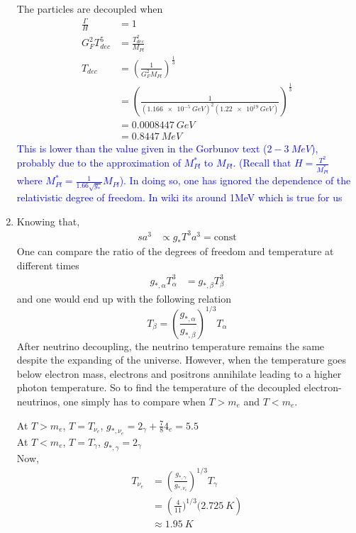 \begin{enumerate}[label=\alph*)]
The particles are decoupled when 
\begin{align*}
\frac{\Gamma}{H} &= 1 \\
G_F^2 T_{dec}^5 &= \frac{T_{dec}^2}{M_{Pl}}\\
T_{dec} &= \left( \frac{1}{G_F^2 M_{Pl}}\right)^{\frac{1}{3}}\\
&= \left( \frac{1}{(\SI{1.166e-5}{GeV})^2 (\SI{1.22e19}{GeV})}\right)^{\frac{1}{3}}\\
&= \SI{0.0008447}{GeV} \\ &= \SI{0.8447}{MeV} 
\end{align*}
\textcolor{blue}{This is lower than the value given in the Gorbunov text ($2 - 3 \SI{}{MeV}$), probably due to the approximation of $M^\ast_{Pl}$ to $M_{Pl}$. (Recall that $H = \frac{T^2}{M^\ast_{Pl}}$ where $M^\ast_{Pl} = \frac{1}{1.66\sqrt{g_\ast}}M_{Pl}$). In doing so, one has ignored the dependence of the relativistic degree of freedom. In wiki its around 1MeV which is true for us}

\item Knowing that,\\
\begin{align}
sa^3 &\propto g_\ast T^3 a^3 = \text{const}
\end{align}
One can compare the ratio of the degrees of freedom and temperature at different times
\begin{align}
g_{\ast,\alpha}T_\alpha^3 &= g_{\ast,\beta}T_\beta^3 
\end{align}
and one would end up with the following relation
\begin{equation}
T_\beta = \left(\frac{g_{\ast,\alpha}}{g_{\ast,\beta}}\right)^{1/3}T_\alpha
\end{equation}
After neutrino decoupling, the neutrino temperature remains the same despite the expanding of the universe. However, when the temperature goes below electron mass, electrons and positrons annihilate leading to a higher photon temperature. 
So to find the temperature of the decoupled electron-neutrinos, one simply has to compare when $T > m_e$ and $T < m_e$.

At $T > m_e$, $T = T_{\nu_e}$, $g_{\ast,\nu_e} = 2_\gamma + \frac{7}{8}4_e = 5.5 $\\
At $T < m_e$, $T= T_{\gamma}$, $g_{\ast,\gamma} = 2_\gamma $\\
Now,
\begin{align}
T_{\nu_e} &= \left(\frac{g_{\ast,\gamma}}{g_{\ast,\nu_e}}\right)^{1/3}T_\gamma \\
&= \left( \frac{4}{11} )^{1/3} (\SI{2.725}{K}\right) \\
&\approx \SI{1.95}{K}
\end{align}


\end{enumerate}
